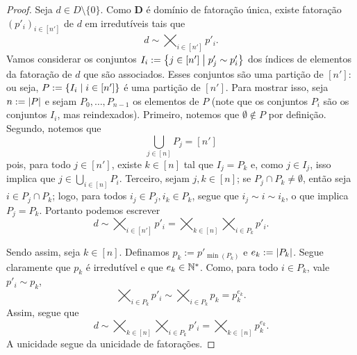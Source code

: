 \begin{proof}
Seja $d \in D \setminus \{0\}$. Como $\bm D$ é domínio de fatoração única, existe fatoração $(p'_i)_{i \in [n']}$ de $d$ em irredutíveis tais que
	\begin{equation*}
	d \sim \bigtimes_{i \in [n']} p'_i.
	\end{equation*}
Vamos considerar os conjuntos $I_i := \left\{{j \in [n']}\;\middle\vert\;{p'_j \sim p'_i}\right\}$ dos índices de elementos da fatoração de $d$ que são associados. Esses conjuntos são uma partição de $[n']$: ou seja, $P := \left\{{I_i}\;\middle\vert\;{i \in [n']}\right\}$ é uma partição de $[n']$. Para mostrar isso, seja $n := \left\lvert{P}\right\rvert$ e sejam $P_0,\ldots,P_{n-1}$ os elementos de $P$  (note que os conjuntos $P_i$ são os conjuntos $I_i$, mas reindexados). Primeiro, notemos que $\emptyset \notin P$ por definição. Segundo, notemos que
	\begin{equation*}
	\bigcup_{j \in [n]} P_j = [n']
	\end{equation*}
pois, para todo $j \in [n']$, existe $k \in [n]$ tal que $I_j = P_k$ e, como $j \in I_j$, isso implica que $j \in \bigcup_{i \in [n]} P_i$. Terceiro, sejam $j,k \in [n]$; se $P_j \cap P_k \neq \emptyset$, então seja $i \in P_j \cap P_k$; logo, para todos $i_j \in P_j,i_k \in P_k$, segue que $i_j \sim i \sim i_k$, o que implica $P_j=P_k$. Portanto podemos escrever
	\begin{equation*}
	d \sim \bigtimes_{i \in [n']} p'_i = \bigtimes_{k \in [n]} \bigtimes_{i \in P_k} p'_i.
	\end{equation*}

Sendo assim, seja $k \in [n]$. Definamos $p_k := p'_{\min(P_k)}$ e $e_k := \left\lvert{P_k}\right\rvert$. Segue claramente que $p_k$ é irredutível e que $e_k \in \mathbb{N}^*$. Como, para todo $i \in P_k$, vale $p'_i \sim p_k$, 
	\begin{equation*}
	\bigtimes_{i \in P_k} p'_i \sim \bigtimes_{i \in P_k} p_k = p_k^{e_k}.
	\end{equation*}
Assim, segue que
	\begin{equation*}
	d \sim \bigtimes_{k \in [n]} \bigtimes_{i \in P_k} p'_i = \bigtimes_{k \in [n]} p_k^{e_k}.
	\end{equation*}
A unicidade segue da unicidade de fatorações.
\end{proof}

